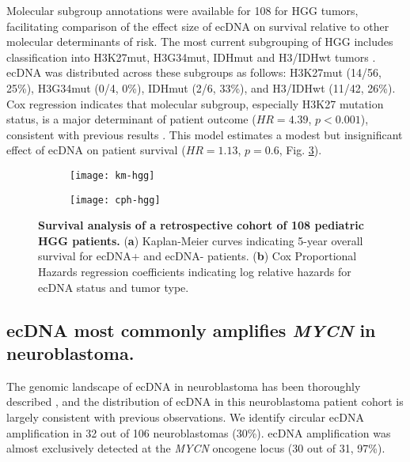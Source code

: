 Molecular subgroup annotations were available for 108 for \gls{HGG} tumors, facilitating comparison of the effect size of ecDNA on survival relative to other molecular determinants of risk. The most current subgrouping of \gls{HGG} includes classification into \gls{H3K27mut}, \gls{H3G34mut}, \gls{IDHmut} and \gls{H3/IDHwt} tumors \cite{mackay_2017}. ecDNA was distributed across these subgroups as follows: \gls{H3K27mut} (14/56, 25\%), \gls{H3G34mut} (0/4, 0\%), \gls{IDHmut} (2/6, 33\%), and \gls{H3/IDHwt} (11/42, 26\%). Cox regression indicates that molecular subgroup, especially H3K27 mutation status, is a major determinant of patient outcome ($HR = 4.39$, $p < 0.001$), consistent with previous results \cite{mackay_2017}. This model estimates a modest but insignificant effect of ecDNA on patient survival ($HR = 1.13$, $p = 0.6$, Fig. \ref{fig:survival-hgg}).

\begin{figure}[!h]
    \centering
    \begin{subfigure}{\textwidth}
        \centering
        \texttt{[image: km-hgg]}
        \caption{}
        \label{subfig:km-hgg}
    \end{subfigure}
    \begin{subfigure}{\textwidth}
        \centering
        \texttt{[image: cph-hgg]}
        \caption{}
        \label{subfig:cph-hgg}
    \end{subfigure}
    \caption[Survival analysis of a retrospective cohort of 108 pediatric \gls{HGG} patients.]{\textbf{Survival analysis of a retrospective cohort of 108 pediatric \gls{HGG} patients.} (\textbf{a}) Kaplan-Meier curves indicating 5-year overall survival for ecDNA+ and ecDNA- patients. (\textbf{b}) Cox Proportional Hazards regression coefficients indicating log relative hazards for ecDNA status and tumor type.}
    \label{fig:survival-hgg}
\end{figure}

\subsection{ecDNA most commonly amplifies \textit{MYCN} in neuroblastoma.} 
\label{NB}
The genomic landscape of ecDNA in neuroblastoma has been thoroughly described \cite{Koche_2020, yi_2022}, and the distribution of ecDNA in this neuroblastoma patient cohort is largely consistent with previous observations. We identify circular ecDNA amplification in 32 out of 106 neuroblastomas (30\%). ecDNA amplification was almost exclusively detected at the \textit{MYCN} oncogene locus (30 out of 31, 97\%). 

